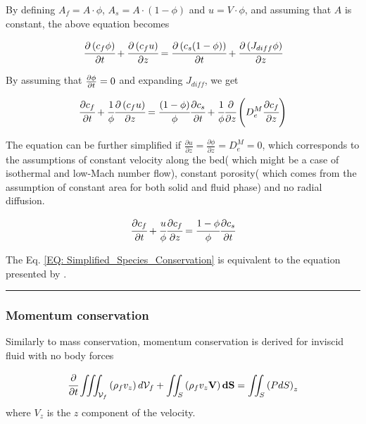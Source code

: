 \documentclass[../Article_Model_Parameters.tex]{subfiles}
\begin{document}
	By defining $A_f = A \cdot \phi$, $A_s = A \cdot \left( 1-\phi \right)$ and $u=V \cdot \phi$, and assuming that $A$ is constant, the above equation becomes
	
	{\footnotesize
		\begin{equation}
			\cfrac{\partial \left( c_f \phi \right)}{\partial t} + \cfrac{\partial \left( c_f u\right)}{\partial z} = \cfrac{\partial \left( c_s (1-\phi) \right) }{\partial t} + \cfrac{\partial \left( J_{diff} \phi \right) }{\partial z}
		\end{equation}
	}

	By assuming that ${\footnotesize \frac{\partial \phi}{\partial t}=0}$ and expanding $J_{diff}$, we get
	
	{\footnotesize
		\begin{equation}
			\cfrac{\partial c_f}{\partial t} + \cfrac{1}{\phi} \cfrac{\partial \left( c_f u\right)}{\partial z} = \cfrac{ (1-\phi)}{\phi} \cfrac{\partial c_s }{\partial t} + \cfrac{1}{\phi} \cfrac{\partial}{\partial z} \left( D_e^M \cfrac{\partial c_f}{\partial z} \right)
		\end{equation}
	}
	
	The equation can be further simplified if $\frac{\partial u}{\partial z} = \frac{\partial \phi}{\partial z} = D_e^M = 0$, which corresponds to the assumptions of constant velocity along the bed( which might be a case of isothermal and low-Mach number flow), constant porosity( which comes from the assumption of constant area for both solid and fluid phase) and no radial diffusion.
	
	{\footnotesize
		\begin{equation}
			\cfrac{\partial c_f}{\partial t} + \cfrac{u}{\phi} \cfrac{\partial c_f}{\partial z}  = \cfrac{1-\phi}{\phi} \cfrac{\partial c_s}{\partial t} 
			\label{EQ: Simplified_Species_Conservation}
		\end{equation}
	}

	The Eq. \ref{EQ: Simplified_Species_Conservation} is equivalent to the equation presented by \citet{Reverchon1996}.
	
	\hrule
	
	\subsubsection{Momentum conservation}
	
	Similarly to mass conservation, momentum conservation is derived for inviscid fluid with no body forces
	
	{\footnotesize
		\begin{equation}
			\cfrac{\partial}{\partial t} \iiint_{\mathcal{V}_f} \left( \rho_f v_z \right) d\mathcal{V}_f + \iint_S \left( \rho_f v_z \textbf{V} \right) \textbf{dS} = \iint_S \left( P dS \right)_z
			\label{EQ: Momentum_Integral_Form}
		\end{equation}
	}
	where $V_z$ is the $z$ component of the velocity.
\end{document}

